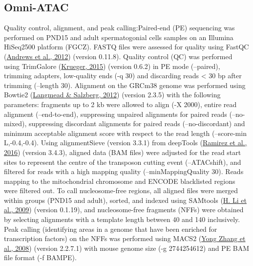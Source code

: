 \documentclass[12pt,twoside]{reedthesis}
\begin{document}
\hypertarget{omni-atac}{%
\subsection{Omni-ATAC}\label{omni-atac}}

Quality control, alignment, and peak calling:Paired-end (PE) sequencing
was performed on PND15 and adult spermatogonial cells samples on an
Illumina HiSeq2500 platform (FGCZ). FASTQ files were assessed for
quality using FastQC (\protect\hyperlink{ref-andrews2012}{Andrews et al., 2012}) (version 0.11.8). Quality control
(QC) was performed using TrimGalore (\protect\hyperlink{ref-krueger2015}{Krueger, 2015}) (version 0.6.2) in PE
mode (--paired), trimming adapters, low-quality ends (-q 30) and
discarding reads \textless{} 30 bp after trimming (--length 30). Alignment on the
GRCm38 genome was performed using Bowtie2 (\protect\hyperlink{ref-langmead2012}{Langmead \& Salzberg, 2012}) (version
2.3.5) with the following parameters: fragments up to 2 kb were allowed
to align (-X 2000), entire read alignment (--end-to-end), suppressing
unpaired alignments for paired reads (--no-mixed), suppressing
discordant alignments for paired reads (--no-discordant) and minimum
acceptable alignment score with respect to the read length (--score-min
L,-0.4,-0.4). Using alignmentSieve (version 3.3.1) from deepTools
(\protect\hyperlink{ref-ramirez2016}{Ramirez et al., 2016}) (version 3.4.3), aligned data (BAM files) were adjusted
for the read start sites to represent the centre of the transposon
cutting event (--ATACshift), and filtered for reads with a high mapping
quality (--minMappingQuality 30). Reads mapping to the mitochondrial
chromosome and ENCODE blacklisted regions were filtered out. To call
nucleosome-free regions, all aligned files were merged within groups
(PND15 and adult), sorted, and indexed using SAMtools (\protect\hyperlink{ref-li2009}{H. Li et al., 2009}) (version
0.1.19), and nucleosome-free fragments (NFFs) were obtained by selecting
alignments with a template length between 40 and 140 inclusively. Peak
calling (identifying areas in a genome that have been enriched for
transcription factors) on the NFFs was performed using MACS2
(\protect\hyperlink{ref-zhang2008}{Yong Zhang et al., 2008}) (version 2.2.7.1) with mouse genome size (-g 2744254612)
and PE BAM file format (-f BAMPE).
\end{document}
